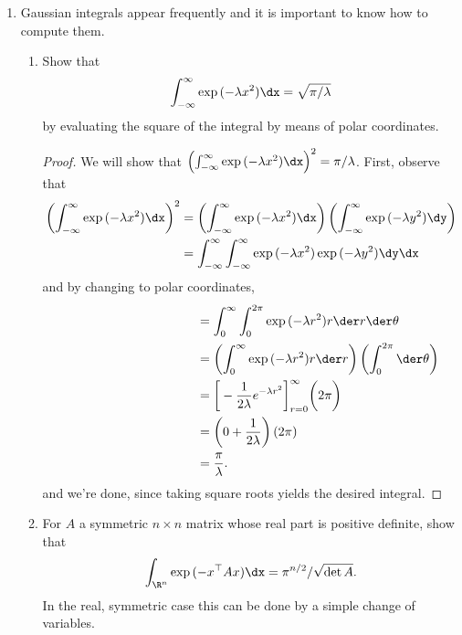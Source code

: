 \documentclass[12pt,letterpaper]{article}
\begin{document}
\begin{enumerate}
\begin{proof}
and finally we can conclude that 
\begin{align*}
\norm{f}_{p,w}
&=\sup_A |A|^{-1/p'} \int_A |f| \dx \\
&\leq \angles{f} (p'),
\end{align*}
so $C_2=p'$, and we're done. 
\end{proof}

\setcounter{enumi}{3}
\item Gaussian integrals appear frequently and it is important to know how to
compute them.
	\begin{enumerate}[label=(\alph*)]
	\item Show that 
	$$\int_{-\infty}^{\infty}\exp{(-\lambda x^2)}\dx = \sqrt{\pi/\lambda}$$
	by evaluating the square of the integral by means of polar coordinates.
	\begin{proof}
	We will show that $\left(\int_{-\infty}^{\infty}\exp{(-\lambda x^2)}\dx\right)^{2} = \pi/\lambda$. First, observe that 
	\begin{align*}
	\left(\int_{-\infty}^{\infty}\exp{(-\lambda x^2)}\dx\right)^{2}
	&= \left(\int_{-\infty}^{\infty}\exp{(-\lambda x^2)}\dx\right)\left(\int_{-\infty}^{\infty}\exp{(-\lambda y^2)}\dy\right) \\
	&= \int_{-\infty}^{\infty} \int_{-\infty}^{\infty} \exp{(-\lambda x^2)} \exp{(-\lambda y^2)}\dy\dx
	\end{align*}
	and by changing to polar coordinates, 
	\begin{align*}
	\phantom{\left(\int_{-\infty}^{\infty}\exp{(-\lambda x^2)}\dx\right)^{2}}
	&= \int_0^\infty \int_0^{2\pi} \exp{(-\lambda r^2)} r\der r\der\theta \\
	&= \left(\int_0^\infty \exp{(-\lambda r^2)} r\der r \right)\left( \int_0^{2\pi} \der\theta\right)\\
	&= \bigg[ -\frac{1}{2\lambda} e^{-\lambda r^2}\bigg]_{r=0}^\infty \bigg( 2\pi \bigg) \\
	&= 	\left(0+\frac{1}{2\lambda}\right)(2\pi)\\
	&= \frac{\pi}{\lambda}.
	\end{align*}
	and we're done, since taking square roots yields the desired integral. 
	\end{proof}		
	
	\item For $A$ a symmetric $n\times	n$ matrix whose real part is positive definite, show that
	$$\int_{\R^n} \exp{(-x^\top Ax)}\dx = {\pi^{n/2}}/{\sqrt{\det A}}.$$
	In the real, symmetric case this can be done by a simple change of variables.
	

\end{enumerate}
\end{enumerate}
\end{document}
